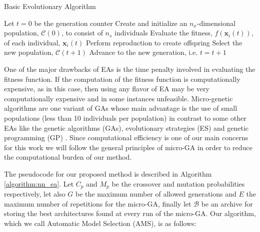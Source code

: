 \documentclass[journal]{IEEEtran}
\begin{document}
\begin{algorithm}[!htb]
\caption{Basic Evolutionary Algorithm}
\begin{algorithmic}
\State Let $t = 0$ be the generation counter
\State Create and initialize an $n_x$-dimensional population, $\mathcal{C}(0)$, to consist of $n_s$ individuals
	\State Evaluate the fitness, $f(\mathbf{x}_i(t))$, of each individual, $\mathbf{x}_i(t)$
	\State Perform reproduction to create offspring
	\State Select the new population, $\mathcal{C}(t+1)$
	\State Advance to the new generation, i.e. $t = t +1$
\EndWhile
\end{algorithmic}
\label{algorithm:generic_ea}
\end{algorithm}

One of the major drawbacks of EAs is the time penalty involved in evaluating the fitness function. If the computation of the fitness function is computationally expensive, as in this case, then using any flavor of EA may be very computationally expensive and in some instances unfeasible. Micro-genetic algorithms \cite{Krishnakumar1989} are one variant of GAs whose main advantage is the use of small populations (less than 10 individuals per population) in contrast to some other EAs like the genetic algorithms (GAs), evolutionary strategies (ES) and genetic programming (GP) \cite{Engelbrecht2007}. Since computational efficiency is one of our main concerns for this work we will follow the general principles of micro-GA in order to reduce the computational burden of our method. 

The pseudocode for our proposed method is described in Algorithm \ref{algorithm:nn_ea}. Let $C_p$ and $M_p$ be the crossover and mutation probabilities respectively, let also $G$ be the maximum number of allowed generations and $E$ the maximum number of repetitions for the micro-GA, finally let $\mathcal{B}$ be an archive for storing the best architectures found at every run of the micro-GA. Our algorithm, which we call Automatic Model Selection (AMS), is as follows:
\end{document}
